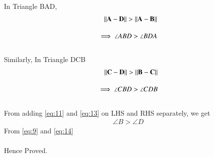 \documentclass[journal,12pt,twocolumn]{IEEEtran}
\begin{document}
In Triangle BAD,
\begin{align}
\lVert\mathbf{A-D}\rVert > \lVert\mathbf{A-B}\rVert\\[1em]
\implies \angle ABD > \angle BDA \label{eq:11}
\end{align}\\
Similarly, In Triangle DCB
\begin{align}
\lVert\mathbf{C-D}\rVert > \lVert\mathbf{B-C}\rVert\\[1em]
\implies \angle CBD > \angle CDB \label{eq:13}
\end{align}\\
From adding \eqref{eq:11} and \eqref{eq:13} on LHS and RHS separately, we get
\begin{align}
    \angle B > \angle D \label{eq:14}
\end{align}
From \eqref{eq:9} and \eqref{eq:14}\\\\Hence Proved.
\end{document}
